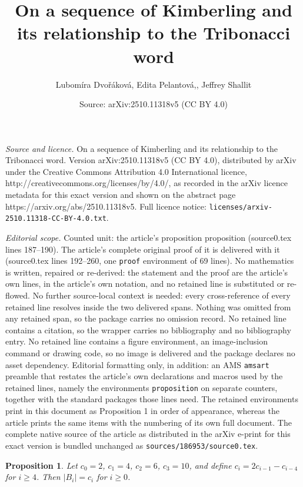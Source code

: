 \documentclass[10pt,a4paper]{amsart}
\title{On a sequence of Kimberling and its relationship to the Tribonacci word}
\author{Lubom\'ira Dvo\v{r}\'akov\'a, Edita Pelantov\'a,, Jeffrey Shallit}
\date{Source: arXiv:2510.11318v5 (CC BY 4.0)}
\newtheorem{proposition}{Proposition}
\begin{document}
\maketitle

\noindent\emph{Source and licence.} On a sequence of Kimberling and its relationship to the Tribonacci word. Version arXiv:2510.11318v5 (CC BY 4.0), distributed by arXiv under the Creative Commons Attribution 4.0 International licence, http://creativecommons.org/licenses/by/4.0/, as recorded in the arXiv licence metadata for this exact version and shown on the abstract page https://arxiv.org/abs/2510.11318v5. Full licence notice: \texttt{licenses/arxiv-2510.11318-CC-BY-4.0.txt}.\par\smallskip

\noindent\textit{Editorial scope.} Counted unit: the article's proposition proposition (source0.tex lines 187--190). The article's complete original proof of it is delivered with it (source0.tex lines 192--260, one \texttt{proof} environment of 69 lines). No mathematics is written, repaired or re-derived: the statement and the proof are the article's own lines, in the article's own notation, and no retained line is substituted or re-flowed.  No further source-local context is needed: every cross-reference of every retained line resolves inside the two delivered spans.  Nothing was omitted from any retained span, so the package carries no omission record.  No retained line contains a citation, so the wrapper carries no bibliography and no bibliography entry.  No retained line contains a figure environment, an image-inclusion command or drawing code, so no image is delivered and the package declares no asset dependency.  Editorial formatting only, in addition: an AMS \texttt{amsart} preamble that restates the article's own declarations and macros used by the retained lines, namely the environments \texttt{proposition} on separate counters, together with the standard packages those lines need.  The retained environments print in this document as Proposition 1 in order of appearance, whereas the article prints the same items with the numbering of its own full document.  The complete native source of the article as distributed in the arXiv e-print for this exact version is bundled unchanged as \texttt{sources/186953/source0.tex}.
\begin{proposition}
Let $c_0 = 2$, $c_1 = 4$, $c_2 = 6$, $c_3 = 10$, and
define $c_i = 2c_{i-1} - c_{i-4}$ for $i \geq 4$.  Then $|B_i|= c_i$ for $i \geq 0$.
\end{proposition}
\end{document}

